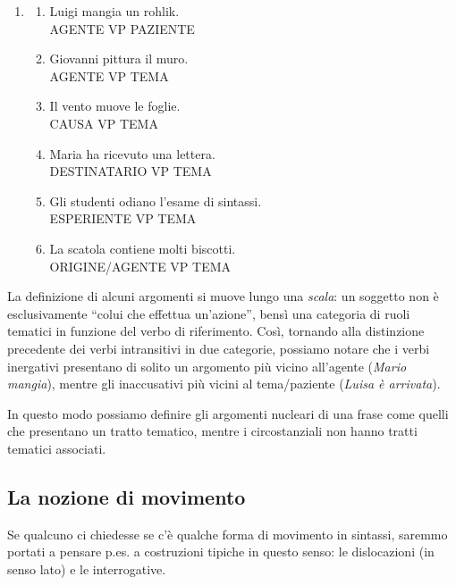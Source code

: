 \documentclass[
  a4paper,
  twoside,
  11pt,
  chapterprefix=false,
  bibliography=totocnumbered,
  listof=flat]{scrbook}
\providecommand{\tightlist}{%
  \setlength{\itemsep}{0pt}\setlength{\parskip}{0pt}}
\begin{document}
\begin{enumerate}
\def\labelenumi{(\arabic{enumi})}
\setcounter{enumi}{13}
\item
  \begin{enumerate}
  \def\labelenumii{\arabic{enumii}.}
  \tightlist
  \item
    Luigi mangia un rohlik.\\
    AGENTE VP PAZIENTE
  \item
    Giovanni pittura il muro.\\
    AGENTE VP TEMA
  \item
    Il vento muove le foglie.\\
    CAUSA VP TEMA
  \item
    Maria ha ricevuto una lettera.\\
    DESTINATARIO VP TEMA
  \item
    Gli studenti odiano l'esame di sintassi.\\
    ESPERIENTE VP TEMA
  \item
    La scatola contiene molti biscotti.\\
    ORIGINE/AGENTE VP TEMA
  \end{enumerate}
\end{enumerate}

La definizione di alcuni argomenti si muove lungo una \emph{scala}: un soggetto non è esclusivamente \enquote{colui che effettua un'azione}, bensì una categoria di ruoli tematici in funzione del verbo di riferimento. Così, tornando alla distinzione precedente dei verbi intransitivi in due categorie, possiamo notare che i verbi inergativi presentano di solito un argomento più vicino all'agente (\emph{Mario mangia}), mentre gli inaccusativi più vicini al tema/paziente (\emph{Luisa è arrivata}).

In questo modo possiamo definire gli argomenti nucleari di una frase come quelli che presentano un tratto tematico, mentre i circostanziali non hanno tratti tematici associati.

\hypertarget{la-nozione-di-movimento}{%
\subsection{La nozione di movimento}\label{la-nozione-di-movimento}}

Se qualcuno ci chiedesse se c'è qualche forma di movimento in sintassi, saremmo portati a pensare p.es. a costruzioni tipiche in questo senso: le dislocazioni (in senso lato) e le interrogative.
\end{document}
